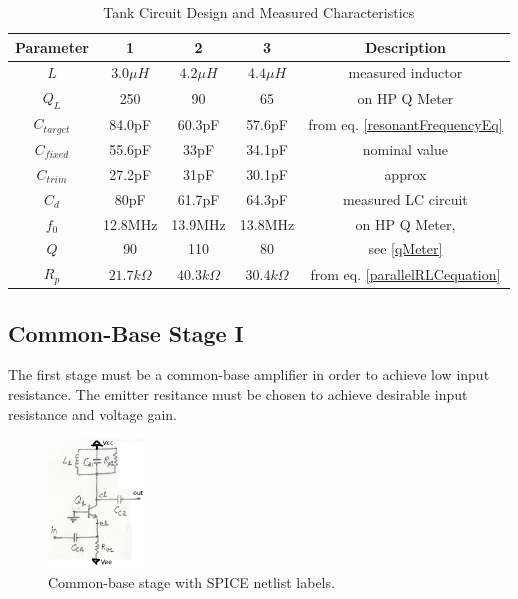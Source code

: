 \documentclass[titlepage, letterpaper, 11pt]{article}
\begin{document}
\begin{table}[ht]
\centering
\caption{Tank Circuit Design and Measured Characteristics}
\begin{tabular}{c|c|c|c|c}
\hline\hline
Parameter	&1		&2		&3		&Description	\\
\hline\hline
$L$		&$3.0\mu H$	&$4.2\mu H$	&$4.4\mu H$	&measured inductor	\\
$Q_{L}$		&250		&90		&65		&on HP Q Meter	\\
\hline
$C_{target}$	&84.0pF		&60.3pF		&57.6pF		&from eq. \ref{resonantFrequencyEq}	\\
$C_{fixed}$	&55.6pF		&33pF		&34.1pF		&nominal value		\\
$C_{trim}$	&27.2pF		&31pF		&30.1pF		&approx		\\
\hline
$C_{d}$		&80pF		&61.7pF		&64.3pF		&measured LC circuit	\\
$f_{0}$		&12.8MHz	&13.9MHz	&13.8MHz	&on HP Q Meter,		\\
$Q$		&90		&110		&80	&see \ref{qMeter}	\\
$R_{p}$		&$21.7k\Omega$	&$40.3k\Omega$	&$30.4k\Omega$	&from eq. \ref{parallelRLCequation}	\\
\hline\hline
\end{tabular}
\label{tankCircuitCharacteristics}
\end{table}

\subsection{Common-Base Stage I}

The first stage must be a common-base amplifier in order to achieve
low input resistance. The emitter resitance must be
chosen to achieve desirable input resistance and voltage gain.

\begin{figure}[ht]
	\centering
	\includegraphics[width=0.23\textwidth]
		{figures/commonBaseStage}
	\caption{
		Common-base stage with SPICE netlist labels.
	}
	\label{commonBaseStage}
\end{figure}
\end{document}

